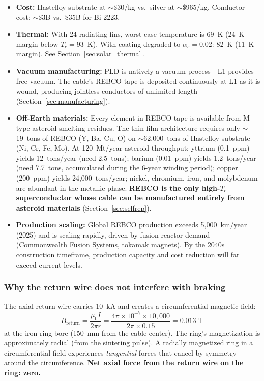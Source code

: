 \documentclass[12pt,letterpaper]{article}
\begin{document}
\begin{itemize}[nosep]
  \item \textbf{Cost:} Hastelloy substrate at ${\sim}$\$30/kg vs.\ silver at ${\sim}$\$965/kg. Conductor cost: ${\sim}$\$3B vs.\ \$35B for Bi-2223.
  \item \textbf{Thermal:} With 24 radiating fins, worst-case temperature is 69~K (24~K margin below $T_c = 93$~K). With coating degraded to $\alpha_s = 0.02$: 82~K (11~K margin). See Section~\ref{sec:solar_thermal}.
  \item \textbf{Vacuum manufacturing:} PLD is natively a vacuum process---L1 provides free vacuum. The cable's REBCO tape is deposited continuously at L1 as it is wound, producing jointless conductors of unlimited length (Section~\ref{sec:manufacturing}).
  \item \textbf{Off-Earth materials:} Every element in REBCO tape is available from M-type asteroid smelting residues. The thin-film architecture requires only ${\sim}$19~tons of REBCO (Y, Ba, Cu, O) on ${\sim}$62{,}000~tons of Hastelloy substrate (Ni, Cr, Fe, Mo). At 120~Mt/year asteroid throughput: yttrium (0.1~ppm) yields 12~tons/year (need 2.5~tons); barium (0.01~ppm) yields 1.2~tons/year (need 7.7~tons, accumulated during the 6-year winding period); copper (200~ppm) yields 24{,}000~tons/year; nickel, chromium, iron, and molybdenum are abundant in the metallic phase. \textbf{REBCO is the only high-$T_c$ superconductor whose cable can be manufactured entirely from asteroid materials} (Section~\ref{sec:selfrep}).
  \item \textbf{Production scaling:} Global REBCO production exceeds 5{,}000~km/year (2025) and is scaling rapidly, driven by fusion reactor demand (Commonwealth Fusion Systems, tokamak magnets). By the 2040s construction timeframe, production capacity and cost reduction will far exceed current levels.
\end{itemize}

\subsubsection{Why the return wire does not interfere with braking}

The axial return wire carries 10~kA and creates a circumferential magnetic field:
\begin{equation}
B_{\text{return}} = \frac{\mu_0 I}{2\pi r} = \frac{4\pi \times 10^{-7} \times 10{,}000}{2\pi \times 0.15} = 0.013 \text{~T}
\end{equation}
at the iron ring bore (150~mm from the cable center). The ring's magnetization is approximately radial (from the sintering pulse). A radially magnetized ring in a circumferential field experiences \emph{tangential} forces that cancel by symmetry around the circumference. \textbf{Net axial force from the return wire on the ring: zero.}
\end{document}
